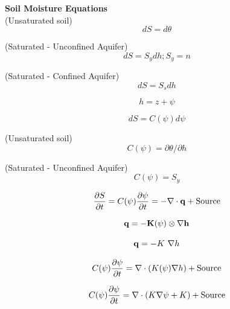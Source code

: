\documentclass{article}
\begin{document}
\textbf{Soil Moisture Equations} \\

(Unsaturated soil)
\begin{equation}
 dS=d\theta 
\end{equation}

(Saturated - Unconfined Aquifer)
\begin{equation}
 dS=S_y dh ; S_y = n
\end{equation}

(Saturated - Confined Aquifer)
\begin{equation}
 dS=S_s dh
\end{equation}

\begin{equation}
 h=z+\psi
\end{equation}

\begin{equation}
dS = C(\psi)d\psi
\end{equation}

(Unsaturated soil)
\begin{equation}
C(\psi)=\partial \theta /\partial h 
\end{equation}

(Saturated  - Unconfined Aquifer)
\begin{equation}
C(\psi)=S_y 
\end{equation}

\begin{equation}
     \frac{\partial S}{\partial t} = C(\psi)\frac{\partial \psi}{\partial t} = -\nabla \cdot {\bf{q}} + {\rm Source}
\label{Richards}
\end{equation}

\begin{equation}
     \bf{q} = - \mathbf{K}(\psi) \otimes \nabla h
\end{equation}

\begin{equation}
     {\bf{q}} = - K \ \nabla h
\end{equation}

\begin{equation}
     C(\psi)\frac{\partial \psi}{\partial t}  = \nabla \cdot \left( {K(\psi) \nabla h} \right) + {\rm Source}
\label{Richards_simple}
\end{equation}

\begin{equation}
     C(\psi)\frac{\partial \psi}{\partial t}  = \nabla \cdot \left( {K \nabla \psi} + K \right) + {\rm Source}
\label{Richards_simple}
\end{equation}
\end{document}
